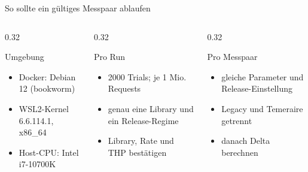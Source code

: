 \documentclass[aspectratio=169,10pt]{beamer}
\begin{document}
\begin{frame}{So sollte ein g\"ultiges Messpaar ablaufen}
\begin{center}
{%
}
\end{center}
\vspace{0.18em}
\begin{columns}[T,totalwidth=\textwidth]
  \begin{column}{0.32\textwidth}
    \begin{block}{\faServer\quad Umgebung}
      \scriptsize
      \begin{itemize}
        \item Docker: Debian 12 (bookworm)
        \item WSL2-Kernel 6.6.114.1, x86\_64
        \item Host-CPU: Intel i7-10700K
      \end{itemize}
    \end{block}
  \end{column}
  \begin{column}{0.32\textwidth}
    \begin{block}{\faCogs\quad Pro Run}
      \scriptsize
      \begin{itemize}
        \item 2000 Trials; je 1 Mio. Requests
        \item genau eine Library und ein Release-Regime
        \item Library, Rate und THP best\"atigen
      \end{itemize}
    \end{block}
  \end{column}
  \begin{column}{0.32\textwidth}
    \begin{block}{\faClipboardCheck\quad Pro Messpaar}
      \scriptsize
      \begin{itemize}
        \item gleiche Parameter und Release-Einstellung
        \item Legacy und Temeraire getrennt
        \item danach Delta berechnen
      \end{itemize}
    \end{block}
  \end{column}
\end{columns}
\end{frame}
\end{document}
